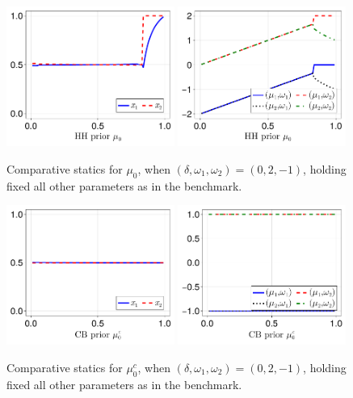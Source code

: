 \documentclass[12pt,a4paper]{article}
\begin{document}
\begin{figure}[H]
\centering
\includegraphics[width=0.49\textwidth]{figures/V8/γ_1/fig_optimal_π_across_μ_0_ω_1_2_ω_2_-1_δ_0.0_.pdf}
\includegraphics[width=0.49\textwidth]{figures/V8/γ_1/fig_posterior_across_μ_0_ω_1_2_ω_2_-1_δ_0.0_.pdf}
\caption{Comparative statics for $\mu_0$, when $(\delta,\omega_1,\omega_2)=(0,2,-1)$, holding fixed all other parameters as in the benchmark.}
\label{FigureA27}
\end{figure}

\begin{figure}[H]
\centering
\includegraphics[width=0.49\textwidth]{figures/V8/γ_1/fig_optimal_π_across_μ_0_c_ω_1_2_ω_2_-1_δ_0.0_.pdf}
\includegraphics[width=0.49\textwidth]{figures/V8/γ_1/fig_posterior_across_μ_0_c_ω_1_2_ω_2_-1_δ_0.0_.pdf}
\caption{Comparative statics for $\mu_0^c$, when $(\delta,\omega_1,\omega_2)=(0,2,-1)$, holding fixed all other parameters as in the benchmark.}
\label{FigureA28}
\end{figure}
\end{document}
